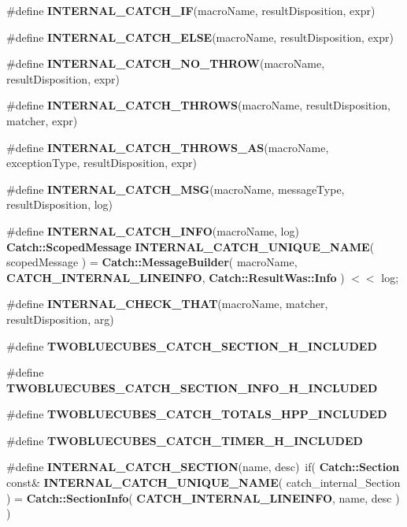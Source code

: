 \begin{DoxyCompactItemize}
\item 
\#define \textbf{ I\+N\+T\+E\+R\+N\+A\+L\+\_\+\+C\+A\+T\+C\+H\+\_\+\+IF}(macro\+Name,  result\+Disposition,  expr)
\item 
\#define \textbf{ I\+N\+T\+E\+R\+N\+A\+L\+\_\+\+C\+A\+T\+C\+H\+\_\+\+E\+L\+SE}(macro\+Name,  result\+Disposition,  expr)
\item 
\#define \textbf{ I\+N\+T\+E\+R\+N\+A\+L\+\_\+\+C\+A\+T\+C\+H\+\_\+\+N\+O\+\_\+\+T\+H\+R\+OW}(macro\+Name,  result\+Disposition,  expr)
\item 
\#define \textbf{ I\+N\+T\+E\+R\+N\+A\+L\+\_\+\+C\+A\+T\+C\+H\+\_\+\+T\+H\+R\+O\+WS}(macro\+Name,  result\+Disposition,  matcher,  expr)
\item 
\#define \textbf{ I\+N\+T\+E\+R\+N\+A\+L\+\_\+\+C\+A\+T\+C\+H\+\_\+\+T\+H\+R\+O\+W\+S\+\_\+\+AS}(macro\+Name,  exception\+Type,  result\+Disposition,  expr)
\item 
\#define \textbf{ I\+N\+T\+E\+R\+N\+A\+L\+\_\+\+C\+A\+T\+C\+H\+\_\+\+M\+SG}(macro\+Name,  message\+Type,  result\+Disposition,  log)
\item 
\#define \textbf{ I\+N\+T\+E\+R\+N\+A\+L\+\_\+\+C\+A\+T\+C\+H\+\_\+\+I\+N\+FO}(macro\+Name,  log)~\textbf{ Catch\+::\+Scoped\+Message} \textbf{ I\+N\+T\+E\+R\+N\+A\+L\+\_\+\+C\+A\+T\+C\+H\+\_\+\+U\+N\+I\+Q\+U\+E\+\_\+\+N\+A\+ME}( scoped\+Message ) = \textbf{ Catch\+::\+Message\+Builder}( macro\+Name, \textbf{ C\+A\+T\+C\+H\+\_\+\+I\+N\+T\+E\+R\+N\+A\+L\+\_\+\+L\+I\+N\+E\+I\+N\+FO}, \textbf{ Catch\+::\+Result\+Was\+::\+Info} ) $<$$<$ log;
\item 
\#define \textbf{ I\+N\+T\+E\+R\+N\+A\+L\+\_\+\+C\+H\+E\+C\+K\+\_\+\+T\+H\+AT}(macro\+Name,  matcher,  result\+Disposition,  arg)
\item 
\#define \textbf{ T\+W\+O\+B\+L\+U\+E\+C\+U\+B\+E\+S\+\_\+\+C\+A\+T\+C\+H\+\_\+\+S\+E\+C\+T\+I\+O\+N\+\_\+\+H\+\_\+\+I\+N\+C\+L\+U\+D\+ED}
\item 
\#define \textbf{ T\+W\+O\+B\+L\+U\+E\+C\+U\+B\+E\+S\+\_\+\+C\+A\+T\+C\+H\+\_\+\+S\+E\+C\+T\+I\+O\+N\+\_\+\+I\+N\+F\+O\+\_\+\+H\+\_\+\+I\+N\+C\+L\+U\+D\+ED}
\item 
\#define \textbf{ T\+W\+O\+B\+L\+U\+E\+C\+U\+B\+E\+S\+\_\+\+C\+A\+T\+C\+H\+\_\+\+T\+O\+T\+A\+L\+S\+\_\+\+H\+P\+P\+\_\+\+I\+N\+C\+L\+U\+D\+ED}
\item 
\#define \textbf{ T\+W\+O\+B\+L\+U\+E\+C\+U\+B\+E\+S\+\_\+\+C\+A\+T\+C\+H\+\_\+\+T\+I\+M\+E\+R\+\_\+\+H\+\_\+\+I\+N\+C\+L\+U\+D\+ED}
\item 
\#define \textbf{ I\+N\+T\+E\+R\+N\+A\+L\+\_\+\+C\+A\+T\+C\+H\+\_\+\+S\+E\+C\+T\+I\+ON}(name,  desc)~if( \textbf{ Catch\+::\+Section} const\& \textbf{ I\+N\+T\+E\+R\+N\+A\+L\+\_\+\+C\+A\+T\+C\+H\+\_\+\+U\+N\+I\+Q\+U\+E\+\_\+\+N\+A\+ME}( catch\+\_\+internal\+\_\+\+Section ) = \textbf{ Catch\+::\+Section\+Info}( \textbf{ C\+A\+T\+C\+H\+\_\+\+I\+N\+T\+E\+R\+N\+A\+L\+\_\+\+L\+I\+N\+E\+I\+N\+FO}, name, desc ) )
$$
\end{DoxyCompactItemize}
